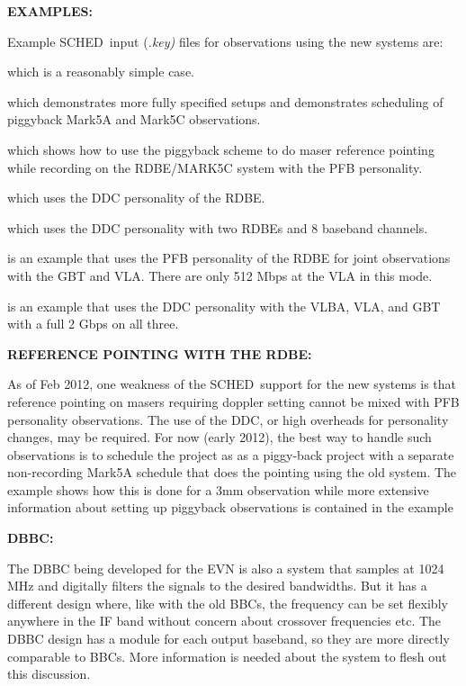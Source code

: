 \documentclass{report}
\newcommand{\schedb}{{\sc SCHED~}}
\begin{document}
{\bf EXAMPLES:}

Example \schedb input {(\sl .key)} files for observations using the
new systems are: 

 which is
a reasonably simple case.

 which demonstrates
more fully specified setups and demonstrates scheduling of piggyback
Mark5A and Mark5C observations.

 which
shows how to use the piggyback scheme to do maser reference pointing 
while recording on the RDBE/MARK5C system with the PFB personality.

 which uses the
DDC personality of the RDBE.

 which uses the
DDC personality with two RDBEs and 8 baseband channels.

 is an example
that uses the PFB personality of the RDBE for joint observations
with the GBT and VLA.  There are only 512 Mbps at the VLA in this 
mode.

 is an
example that uses the DDC personality with the VLBA, VLA, and GBT 
with a full 2 Gbps on all three.

{\bf REFERENCE POINTING WITH THE RDBE:}

As of Feb 2012, one weakness of the \schedb support for the new
systems is that reference
pointing on masers requiring doppler setting cannot be mixed with PFB
personality observations.  The use of the DDC, or high overheads for
personality changes, may be required. For now (early 2012), the best way
to handle such observations is to schedule the project as
as a piggy-back project with a separate non-recording Mark5A schedule
that does the pointing using the old system.  The example
 shows
how this is done for a 3mm observation while more extensive information
about setting up piggyback observations is contained in the example

{\bf DBBC:}

The DBBC being developed for the EVN is also a system that samples
at 1024 MHz and digitally filters the signals to the desired bandwidths.
But it has a different design where, like with the old BBCs, the frequency
can be set flexibly anywhere in the IF band without concern about
crossover frequencies etc.  The DBBC design has a module for each output
baseband, so they are more directly comparable to BBCs.  More information
is needed about the system to flesh out this discussion.
\end{document}
